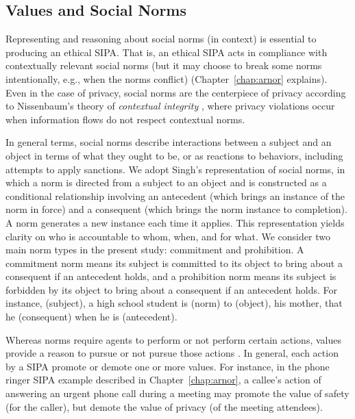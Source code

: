 \subsection{Values and Social Norms}
Representing and reasoning about social norms (in context) is essential to producing an ethical SIPA. 
That is, an ethical SIPA acts in compliance with contextually relevant social norms (but it may choose to break some norms intentionally, e.g., when the norms conflict) (Chapter~\ref{chap:arnor} explains). 
Even in the case of privacy, social norms are the centerpiece of privacy according to Nissenbaum's theory of \emph{contextual integrity} \citep{Nissenbaum-04:integrity,Nissenbaum-11:online}, where privacy violations occur when information flows do not respect contextual norms.

In general terms, social norms describe interactions between a subject and an object in terms of what they ought to be, or as reactions to behaviors, including attempts to apply sanctions. 
We adopt Singh's  representation of social norms, in which a norm is directed from a subject to an object and is constructed as a conditional relationship involving an antecedent (which brings an instance of the norm in force) and a consequent (which brings the norm instance to completion). 
A norm generates a new instance each time it applies. 
This representation yields clarity on who is accountable to whom, when, and for what. 
We consider two main norm types in the present study: commitment and prohibition. 
A commitment norm means its subject is committed to its object to bring about a consequent if an antecedent holds, and a prohibition norm means its subject is forbidden by its object to bring about a consequent if an antecedent holds. 
For instance,  (subject), a high school student is  (norm) to  (object), his mother, that he  (consequent) when he is  (antecedent).

Whereas norms require agents to perform or not perform certain actions, values provide a reason to pursue or not pursue those actions \citep{Dechesne-AIL13-Norms+Values}. 
In general, each action by a SIPA promote or demote one or more values. 
For instance, in the phone ringer SIPA example described in Chapter~\ref{chap:arnor}, a callee's action of answering an urgent phone call during a meeting may promote the value of safety (for the caller), but demote the value of privacy (of the meeting attendees).

